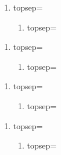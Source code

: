 ﻿\documentclass{article}
\begin{document}
    \begin{minipage}[t]{.25\textwidth}
        \begin{enumerate}
            \item topsep=\the\topsep
            \begin{enumerate}
                \item topsep=\the\topsep
            \end{enumerate}
        \end{enumerate}
    
        \begin{enumerate}
            \item topsep=\the\topsep
            \begin{enumerate}
                \item topsep=\the\topsep
            \end{enumerate}
        \end{enumerate} %
    
        \begin{enumerate}
            \item topsep=\the\topsep
            \begin{enumerate}
                \item topsep=\the\topsep
            \end{enumerate}
        \end{enumerate} %
    
        \begin{enumerate}
            \item topsep=\the\topsep
            \begin{enumerate}
                \item topsep=\the\topsep
            \end{enumerate}
        \end{enumerate} %
    \end{minipage}
\end{document}
